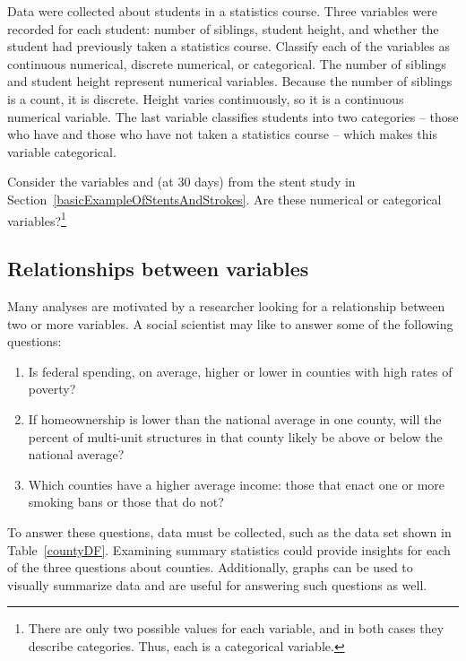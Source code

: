 \begin{example}{Data were collected about students in a statistics course. Three variables were recorded for each student: number of siblings, student height, and whether the student had previously taken a statistics course. Classify each of the variables as continuous numerical, discrete numerical, or categorical.}
The number of siblings and student height represent numerical variables. Because the number of siblings is a count, it is discrete. Height varies continuously, so it is a continuous numerical variable. The last variable classifies students into two categories -- those who have and those who have not taken a statistics course -- which makes this variable categorical.
\end{example}

\begin{exercise} 
Consider the variables  and  (at 30 days) from the stent study in Section~\ref{basicExampleOfStentsAndStrokes}. Are these numerical or categorical variables?\footnote{There are only two possible values for each variable, and in both cases they describe categories. Thus, each is a categorical variable.}
\end{exercise}

\subsection{Relationships between variables}
\label{variableRelations}

Many analyses are motivated by a researcher looking for a relationship between two or more variables. A social scientist may like to answer some of the following questions:
\begin{enumerate}
\setlength{\itemsep}{0mm}
\item[(1)]\label{fedSpendingPovertyQuestion} Is federal spending, on average, higher or lower in counties with high rates of poverty?
\item[(2)]\label{ownershipMultiUnitQuestion} If homeownership is lower than the national average in one county, will the percent of multi-unit structures in that county likely be above or below the national average?
\item[(3)]\label{isAverageIncomeAssociatedWithSmokingBans} Which counties have a higher average income: those that enact one or more smoking bans or those that do not?
\end{enumerate}

To answer these questions, data must be collected, such as the  data set shown in Table~\ref{countyDF}. Examining summary statistics  could provide insights for each of the three questions about counties. Additionally, graphs can be used to visually summarize data and are useful for answering such questions as well.

